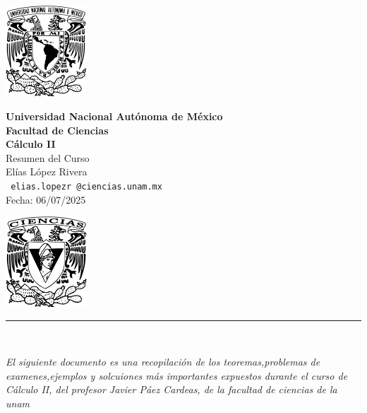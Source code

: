 \documentclass[11pt,letterpaper]{article}
\begin{document}

\begin{center}
    \begin{minipage}{3cm}
    	\begin{center}
    		\includegraphics[height=3.4cm]{logo_unam.png}
    	\end{center}
    \end{minipage}\hfill
    \begin{minipage}{10cm}
    	\begin{center}
    	\textbf{\large Universidad Nacional Autónoma de México}\\[0.1cm]
        \textbf{Facultad de Ciencias}\\[0.1cm]
        \textbf{C\'alculo II}\\[0.1cm]
        Resumen del Curso\\[0.1cm]
         El\'ias L\'opez Rivera\\[0.1cm]
        \texttt{ elias.lopezr\,@ciencias.unam.mx }\\[0.1cm]
        Fecha:\,\,06/07/2025
    	\end{center}
    \end{minipage}\hfill
    \begin{minipage}{3cm}
    	\begin{center}
    		\includegraphics[height=3.4cm]{Logo_FC.png}
    	\end{center}
    \end{minipage}
\end{center}

\rule{17cm}{0.1mm}

\,\\
\begin{tcolorbox}[
	title = \textcolor{black}{\textcolor{white}{C\'alculo 2}},]
\textit{El siguiente documento es una recopilaci\'on de los teoremas,problemas de examenes,ejemplos y solcuiones m\'as 
importantes expuestos durante el curso de C\'alculo II, del profesor Javier Páez Cardeas, de la facultad de ciencias de la unam }
\end{tcolorbox}
\end{document}

